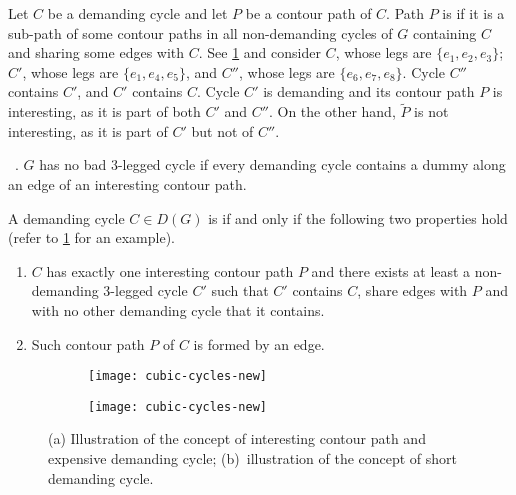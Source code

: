 \documentclass[runningheads]{llncs}
\let\emph\relax\DeclareTextFontCommand{\emph}{\color{dark blue}\em}
\begin{document}
\smallskip 
Let $C$ be a demanding cycle and let $P$ be a contour path of $C$. Path $P$ is \emph{interesting} if it is a sub-path of some contour paths in all non-demanding cycles of $G$ containing $C$ and sharing some edges with $C$. See \cref{app-fig:cubic-interesting-a} and consider $C$, whose legs are $\{e_1,e_2,e_3\}$; $C'$, whose legs are $\{e_1,e_4,e_5\}$, and $C''$, whose legs are $\{e_6,e_7,e_8\}$. Cycle $C''$ contains $C'$, and $C'$ contains $C$. Cycle $C'$ is demanding and its contour path $P$ is interesting, as it is part of both $C'$ and $C''$. On the other hand, $\tilde{P}$ is not interesting, as it is part of $C'$ but not of $C''$.  

\begin{lemma}~\cite{DBLP:conf/soda/DidimoLOP20,DBLP:journals/jgaa/RahmanNN03}.
$G$ has no bad 3-legged cycle if every demanding cycle contains a dummy along an edge of an interesting contour path.
\end{lemma} 

A demanding cycle $C\in D(G)$ is \emph{expensive} if and only if  the following two properties hold (refer to  \cref{app-fig:cubic-interesting-a} for an example).   

\begin{enumerate}[(C1)]
\item \label{enum:C1}
$C$ has exactly one interesting contour path $P$ and there exists at least a non-demanding 3-legged cycle $C'$ such that
$C'$ contains $C$, share edges with $P$ and with no other demanding cycle that it contains.
\item \label{enum:C2} 
Such contour path $P$ of $C$ is formed by an edge. 
\end{enumerate}


\begin{figure}[t]
  \begin{subfigure}{0.48\textwidth}
    \centering
    \texttt{[image: cubic-cycles-new]}
    \subcaption{}
     \label{app-fig:cubic-interesting-a}
  \end{subfigure}
  \hfil
  \begin{subfigure}{0.48\textwidth}
    \centering
    \texttt{[image: cubic-cycles-new]}
    \subcaption{}
    \label{app-fig:cubic-interesting-b}
  \end{subfigure}
  \hfill
  \caption{(a) Illustration of the concept of interesting contour path and expensive demanding cycle; (b)~illustration of the concept of short demanding cycle.}
  \label{app-fig:cubic-interesting}
\end{figure}
\end{document}
